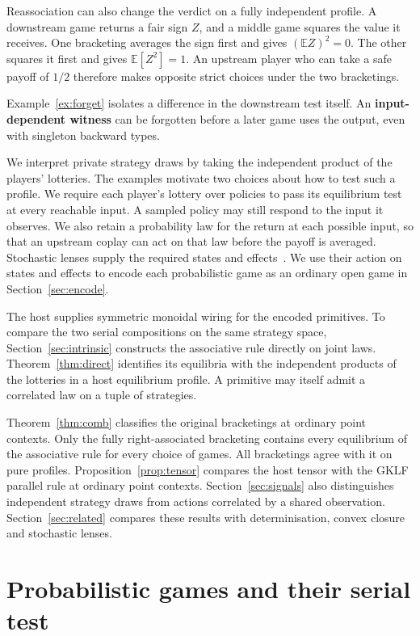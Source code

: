 \documentclass[11pt,a4paper]{article}
\theoremstyle{definition}
\begin{document}
Reassociation can also change the verdict on a fully independent profile. A downstream game returns a fair sign $Z$, and a middle game squares the value it receives. One bracketing averages the sign first and gives $(\mathbb E Z)^2=0$. The other squares it first and gives $\mathbb E[Z^2]=1$. An upstream player who can take a safe payoff of $1/2$ therefore makes opposite strict choices under the two bracketings.

Example~\ref{ex:forget} isolates a difference in the downstream test itself. An \textbf{input-dependent witness} can be forgotten before a later game uses the output, even with singleton backward types.

We interpret private strategy draws by taking the independent product of the players' lotteries. The examples motivate two choices about how to test such a profile. We require each player's lottery over policies to pass its equilibrium test at every reachable input. A sampled policy may still respond to the input it observes. We also retain a probability law for the return at each possible input, so that an upstream coplay can act on that law before the payoff is averaged. Stochastic lenses supply the required states and effects~\cite{bolt}. We use their action on states and effects to encode each probabilistic game as an ordinary open game in Section~\ref{sec:encode}.

The host supplies symmetric monoidal wiring for the encoded primitives. To compare the two serial compositions on the same strategy space, Section~\ref{sec:intrinsic} constructs the associative rule directly on joint laws. Theorem~\ref{thm:direct} identifies its equilibria with the independent products of the lotteries in a host equilibrium profile. A primitive may itself admit a correlated law on a tuple of strategies.

Theorem~\ref{thm:comb} classifies the original bracketings at ordinary point contexts. Only the fully right-associated bracketing contains every equilibrium of the associative rule for every choice of games. All bracketings agree with it on pure profiles. Proposition~\ref{prop:tensor} compares the host tensor with the GKLF parallel rule at ordinary point contexts. Section~\ref{sec:signals} also distinguishes independent strategy draws from actions correlated by a shared observation. Section~\ref{sec:related} compares these results with determinisation, convex closure and stochastic lenses.

\section{Probabilistic games and their serial test}\label{sec:rule}
\end{document}
